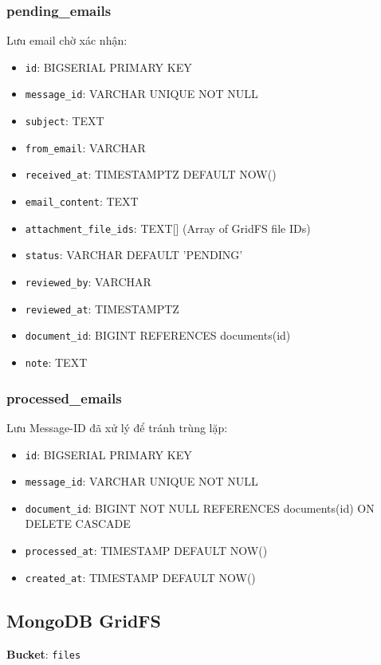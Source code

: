\documentclass[12pt,a4paper]{article}
\begin{document}
\subsubsection{pending\_emails}
Lưu email chờ xác nhận:
\begin{itemize}
    \item \texttt{id}: BIGSERIAL PRIMARY KEY
    \item \texttt{message\_id}: VARCHAR UNIQUE NOT NULL
    \item \texttt{subject}: TEXT
    \item \texttt{from\_email}: VARCHAR
    \item \texttt{received\_at}: TIMESTAMPTZ DEFAULT NOW()
    \item \texttt{email\_content}: TEXT
    \item \texttt{attachment\_file\_ids}: TEXT[] (Array of GridFS file IDs)
    \item \texttt{status}: VARCHAR DEFAULT 'PENDING'
    \item \texttt{reviewed\_by}: VARCHAR
    \item \texttt{reviewed\_at}: TIMESTAMPTZ
    \item \texttt{document\_id}: BIGINT REFERENCES documents(id)
    \item \texttt{note}: TEXT
\end{itemize}

\subsubsection{processed\_emails}
Lưu Message-ID đã xử lý để tránh trùng lặp:
\begin{itemize}
    \item \texttt{id}: BIGSERIAL PRIMARY KEY
    \item \texttt{message\_id}: VARCHAR UNIQUE NOT NULL
    \item \texttt{document\_id}: BIGINT NOT NULL REFERENCES documents(id) ON DELETE CASCADE
    \item \texttt{processed\_at}: TIMESTAMP DEFAULT NOW()
    \item \texttt{created\_at}: TIMESTAMP DEFAULT NOW()
\end{itemize}

\subsection{MongoDB GridFS}

\textbf{Bucket}: \texttt{files}
\end{document}
